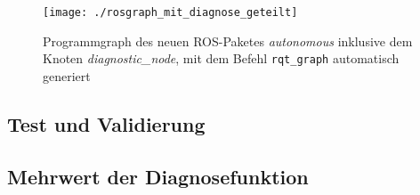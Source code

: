 \begin{figure}[!htbp]
	\centering
	\texttt{[image: ./rosgraph\_mit\_diagnose\_geteilt]}
	\caption{Programmgraph des neuen ROS-Paketes \emph{autonomous} inklusive dem Knoten \emph{diagnostic\_node}, mit dem Befehl \texttt{rqt\_graph} automatisch generiert}
	\label{abb:rosgraphMitDiagnose}
\end{figure} 

\subsection{Test und Validierung} \label{subsec:TestValidierungDiagnose}
\subsection{Mehrwert der Diagnosefunktion} \label{subsec:MehrwertDiagnose}



